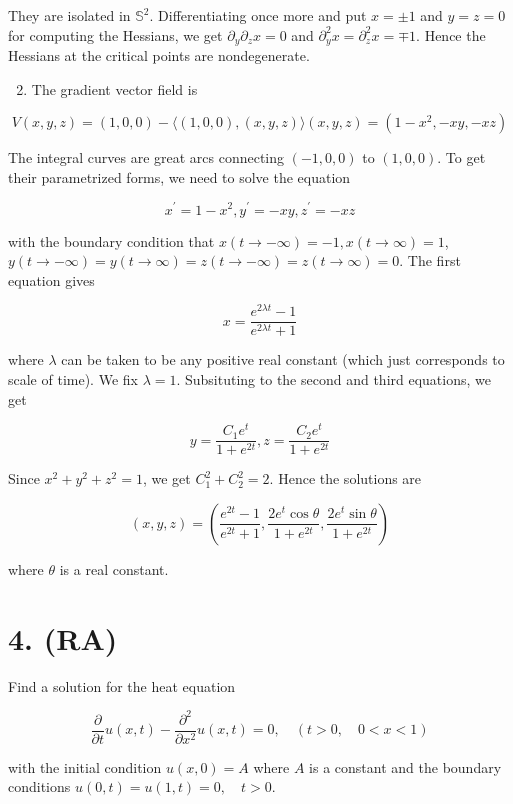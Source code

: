 \documentclass[10pt]{article}
\begin{document}
They are isolated in $\mathbb{S}^{2}$. Differentiating once more and put $x= \pm 1$ and $y=z=0$ for computing the Hessians, we get $\partial_{y} \partial_{z} x=0$ and $\partial_{y}^{2} x=\partial_{z}^{2} x=\mp 1$. Hence the Hessians at the critical points are nondegenerate.

\begin{enumerate}
  \setcounter{enumi}{1}
  \item The gradient vector field is
\end{enumerate}

$$
V(x, y, z)=(1,0,0)-\langle(1,0,0),(x, y, z)\rangle(x, y, z)=\left(1-x^{2},-x y,-x z\right)
$$

The integral curves are great arcs connecting $(-1,0,0)$ to $(1,0,0)$. To get their parametrized forms, we need to solve the equation

$$
x^{\prime}=1-x^{2}, y^{\prime}=-x y, z^{\prime}=-x z
$$

with the boundary condition that $x(t \rightarrow-\infty)=-1, x(t \rightarrow \infty)=1$, $y(t \rightarrow-\infty)=y(t \rightarrow \infty)=z(t \rightarrow-\infty)=z(t \rightarrow \infty)=0$. The first equation gives

$$
x=\frac{e^{2 \lambda t}-1}{e^{2 \lambda t}+1}
$$

where $\lambda$ can be taken to be any positive real constant (which just corresponds to scale of time). We fix $\lambda=1$. Subsituting to the second and third equations, we get

$$
y=\frac{C_{1} e^{t}}{1+e^{2 t}}, z=\frac{C_{2} e^{t}}{1+e^{2 t}}
$$

Since $x^{2}+y^{2}+z^{2}=1$, we get $C_{1}^{2}+C_{2}^{2}=2$. Hence the solutions are

$$
(x, y, z)=\left(\frac{e^{2 t}-1}{e^{2 t}+1}, \frac{2 e^{t} \cos \theta}{1+e^{2 t}}, \frac{2 e^{t} \sin \theta}{1+e^{2 t}}\right)
$$

where $\theta$ is a real constant.

\section{4. (RA)}
Find a solution for the heat equation

$$
\frac{\partial}{\partial t} u(x, t)-\frac{\partial^{2}}{\partial x^{2}} u(x, t)=0, \quad(t>0, \quad 0<x<1)
$$

with the initial condition $u(x, 0)=A$ where $A$ is a constant and the boundary conditions $u(0, t)=u(1, t)=0, \quad t>0$.
\end{document}
